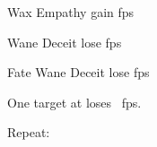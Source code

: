 
  {\mFate}%
  {Wax}%
  {\duplicated}%
  {Empathy}%
  {gain  \glspl{fp}}%
  {}

  {\mFate}%
  {Wane}%
  {\duplicated}%
  {Deceit}%
  {lose  \glspl{fp}}%
  {}

  {Fate}%
  {Wane}%
  {\distant}%
  {Deceit}%
  {lose  \glspl{fp}}%
  {
    One target at \spellRange{} loses ~\glspl{fp}.

    Repeat: 
  }

